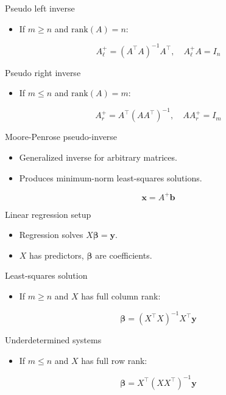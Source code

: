 \documentclass[12pt]{beamer}
\begin{document}
\begin{frame}{Pseudo left inverse}
  \begin{itemize}
    \item If $m \ge n$ and $\mathrm{rank}(A) = n$:
  \end{itemize}
  \[
  A_\ell^+ = (A^\top A)^{-1} A^\top, \quad A_\ell^+ A = I_n
  \]
\end{frame}

\begin{frame}{Pseudo right inverse}
  \begin{itemize}
    \item If $m \le n$ and $\mathrm{rank}(A) = m$:
  \end{itemize}
  \[
  A_r^+ = A^\top (A A^\top)^{-1}, \quad A A_r^+ = I_m
  \]
\end{frame}

\begin{frame}{Moore-Penrose pseudo-inverse}
  \begin{itemize}
    \item Generalized inverse for arbitrary matrices.
    \item Produces minimum-norm least-squares solutions.
  \end{itemize}
  \[
  \bm{x} = A^+ \bm{b}
  \]
\end{frame}

\begin{frame}{Linear regression setup}
  \begin{itemize}
    \item Regression solves $X \boldsymbol{\beta} = \mathbf{y}$.
    \item $X$ has predictors, $\boldsymbol{\beta}$ are coefficients.
  \end{itemize}
\end{frame}

\begin{frame}{Least-squares solution}
  \begin{itemize}
    \item If $m \ge n$ and $X$ has full column rank:
  \end{itemize}
  \[
  \boldsymbol{\beta} = (X^\top X)^{-1} X^\top \mathbf{y}
  \]
\end{frame}

\begin{frame}{Underdetermined systems}
  \begin{itemize}
    \item If $m \le n$ and $X$ has full row rank:
  \end{itemize}
  \[
  \boldsymbol{\beta} = X^\top (X X^\top)^{-1} \mathbf{y}
  \]
\end{frame}
\end{document}
